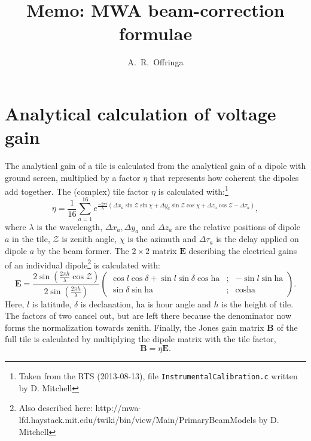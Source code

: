 \documentclass[a4paper,11pt]{article}
\title{Memo: MWA beam-correction formulae}
\author{A.~R.~Offringa}
\begin{document}
\label{firstpage}
\maketitle

\section{Analytical calculation of voltage gain}
The analytical gain of a tile is calculated from the analytical gain of a dipole with ground screen, multiplied by a factor $\eta$ that represents how coherent the dipoles add together. The (complex) tile factor $\eta$ is calculated with:\footnote{Taken from the RTS (2013-08-13), file \texttt{InstrumentalCalibration.c} written by D. Mitchell}
\begin{equation}
 \eta = \frac{1}{16}\sum\limits_{a=1}^{16} e^{\frac{-2 \pi i}{\lambda} \left(\Delta x_a \sin \mathcal{Z} \sin \chi + \Delta y_a \sin \mathcal{Z} \cos \chi + \Delta z_a \cos \mathcal{Z} - \Delta \tau_a \right) },
\end{equation}
where $\lambda$ is the wavelength, $\Delta x_a, \Delta y_a$ and $\Delta z_a$ are the relative positions of dipole $a$ in the tile, $\mathcal{Z}$ is zenith angle, $\chi$ is the azimuth and $\Delta \tau_a$ is the delay applied on dipole $a$ by the beam former. The $2 \times 2$ matrix $\textbf{E}$ describing the electrical gains of an individual dipole\footnote{Also described here: http://mwa-lfd.haystack.mit.edu/twiki/bin/view/Main/PrimaryBeamModels by D. Mitchell} is calculated with:
\begin{equation}
\mathbf{E} = \frac{2 \sin \left( \frac{2 \pi h}{\lambda} \cos \mathcal{Z}\right)}{2 \sin \left( \frac{2 \pi h}{\lambda}\right)}
\left( \begin{array}{ccc}
\cos l \cos \delta + \sin l \sin \delta \cos \textrm{ha} & ; & -\sin l \sin \textrm{ha} \\
\sin \delta \sin \textrm{ha} & ; & \cos \textrm{ha}
\end{array} \right).
\end{equation}
Here, $l$ is latitude, $\delta$ is declanation, $\textrm{ha}$ is hour angle and $h$ is the height of tile. The factors of two cancel out, but are left there because the denominator now forms the normalization towards zenith. Finally, the Jones gain matrix $\textbf{B}$ of the full tile is calculated by multiplying the dipole matrix with the tile factor,
\begin{equation}
\mathbf{B} = \eta \mathbf{E}.
\end{equation}
\end{document}
